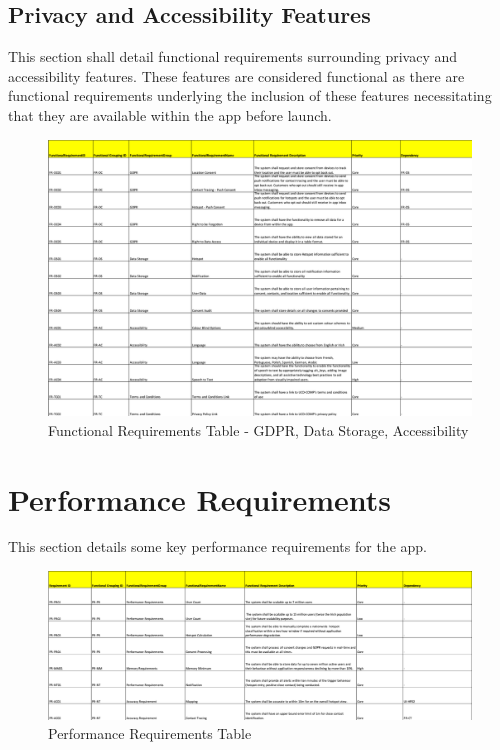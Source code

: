 \documentclass{scrreprt}
\begin{document}
\subsection{Privacy and Accessibility Features}
This section shall detail functional requirements surrounding privacy and accessibility features. These features are considered functional as there are functional requirements underlying the inclusion of these features necessitating that they are available within the app before launch.
\begin{figure}[H]
	\centering
	\includegraphics[page=1, width=0.95\linewidth]{COMP30830-FunctionalRequirements-Acc}
	\caption{Functional Requirements Table - GDPR, Data Storage, Accessibility}
	\label{FR}
\end{figure}



\section{Performance Requirements}
This section details some key performance requirements for the app.
\begin{figure}[H]
	\centering
	\includegraphics[page=1, width=0.95\linewidth]{COMP30830-PerformanceRequirements}
	\caption{Performance Requirements Table}
	\label{PR}
\end{figure}
\end{document}
